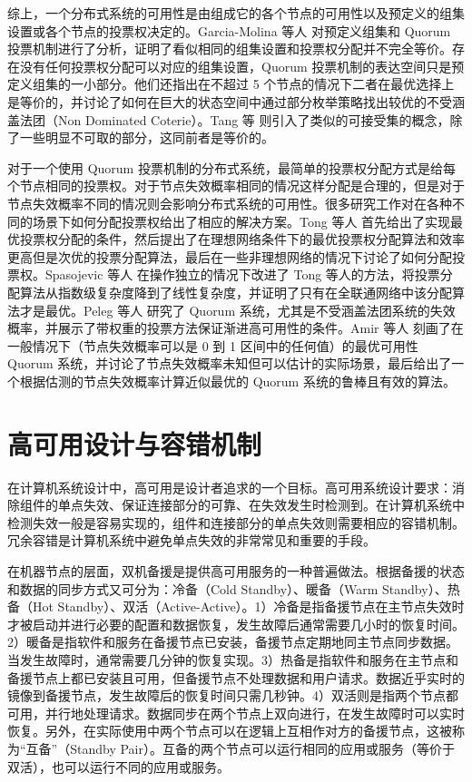 综上，一个分布式系统的可用性是由组成它的各个节点的可用性以及预定义的组集设置或各个节点的投票权决定的。Garcia-Molina 等人 \cite{Garcia-Molina:1985:AVD:4221.4223} 对预定义组集和 Quorum 投票机制进行了分析，证明了看似相同的组集设置和投票权分配并不完全等价。存在没有任何投票权分配可以对应的组集设置，Quorum 投票机制的表达空间只是预定义组集的一小部分。他们还指出在不超过 5 个节点的情况下二者在最优选择上是等价的，并讨论了如何在巨大的状态空间中通过部分枚举策略找出较优的不受涵盖法团（Non Dominated Coterie）。Tang 等 \cite{Tang:1989:SPS:67544.67809} 则引入了类似的可接受集的概念，除了一些明显不可取的部分，这同前者是等价的。

对于一个使用 Quorum 投票机制的分布式系统，最简单的投票权分配方式是给每个节点相同的投票权。对于节点失效概率相同的情况这样分配是合理的，但是对于节点失效概率不同的情况则会影响分布式系统的可用性。很多研究工作对在各种不同的场景下如何分配投票权给出了相应的解决方案。Tong 等人 \cite{25789} 首先给出了实现最优投票权分配的条件，然后提出了在理想网络条件下的最优投票权分配算法和效率更高但是次优的投票分配算法，最后在一些非理想网络的情况下讨论了如何分配投票权。Spasojevic 等人 \cite{262589} 在操作独立的情况下改进了 Tong 等人的方法，将投票分配算法从指数级复杂度降到了线性复杂度，并证明了只有在全联通网络中该分配算法才是最优。Peleg 等人 \cite{Peleg1995210} 研究了 Quorum 系统，尤其是不受涵盖法团系统的失效概率，并展示了带权重的投票方法保证渐进高可用性的条件。Amir 等人 \cite{Amir1998223} 刻画了在一般情况下（节点失效概率可以是 0 到 1 区间中的任何值）的最优可用性 Quorum 系统，并讨论了节点失效概率未知但可以估计的实际场景，最后给出了一个根据估测的节点失效概率计算近似最优的 Quorum 系统的鲁棒且有效的算法。

\section{高可用设计与容错机制}
在计算机系统设计中，高可用是设计者追求的一个目标。高可用系统设计要求：消除组件的单点失效、保证连接部分的可靠、在失效发生时检测到。在计算机系统中检测失效一般是容易实现的，组件和连接部分的单点失效则需要相应的容错机制。冗余容错是计算机系统中避免单点失效的非常常见和重要的手段。

在机器节点的层面，双机备援是提供高可用服务的一种普遍做法。根据备援的状态和数据的同步方式又可分为：冷备（Cold Standby）、暖备（Warm Standby）、热备（Hot Standby）、双活（Active-Active）。1）冷备是指备援节点在主节点失效时才被启动并进行必要的配置和数据恢复，发生故障后通常需要几小时的恢复时间。2）暖备是指软件和服务在备援节点已安装，备援节点定期地同主节点同步数据。当发生故障时，通常需要几分钟的恢复实现。3）热备是指软件和服务在主节点和备援节点上都已安装且可用，但备援节点不处理数据和用户请求。数据近乎实时的镜像到备援节点，发生故障后的恢复时间只需几秒钟。4）双活则是指两个节点都可用，并行地处理请求。数据同步在两个节点上双向进行，在发生故障时可以实时恢复。另外，在实际使用中两个节点可以在逻辑上互相作对方的备援节点，这被称为``互备''（Standby Pair）。互备的两个节点可以运行相同的应用或服务（等价于双活），也可以运行不同的应用或服务。

